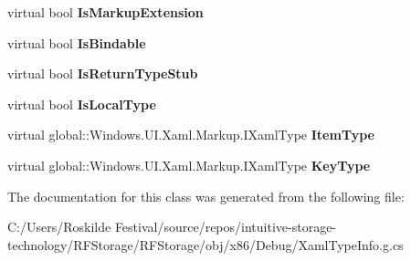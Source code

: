 \begin{DoxyCompactItemize}
\item 
\mbox{\label{class_r_f_storage_1_1_r_f_storage___xaml_type_info_1_1_xaml_system_base_type_a3cf5327d4cd9d30144ebbbbbf9f4e09e}} 
virtual bool {\bfseries Is\+Markup\+Extension}\hspace{0.3cm}{\ttfamily  [get]}
\item 
\mbox{\label{class_r_f_storage_1_1_r_f_storage___xaml_type_info_1_1_xaml_system_base_type_a78f08dadaa8da3c3173405e5d61fbec2}} 
virtual bool {\bfseries Is\+Bindable}\hspace{0.3cm}{\ttfamily  [get]}
\item 
\mbox{\label{class_r_f_storage_1_1_r_f_storage___xaml_type_info_1_1_xaml_system_base_type_a948e3237d0675e65818937eb637bd75e}} 
virtual bool {\bfseries Is\+Return\+Type\+Stub}\hspace{0.3cm}{\ttfamily  [get]}
\item 
\mbox{\label{class_r_f_storage_1_1_r_f_storage___xaml_type_info_1_1_xaml_system_base_type_aa72f0aa88b6465a3d167a1c7e2a40c29}} 
virtual bool {\bfseries Is\+Local\+Type}\hspace{0.3cm}{\ttfamily  [get]}
\item 
\mbox{\label{class_r_f_storage_1_1_r_f_storage___xaml_type_info_1_1_xaml_system_base_type_ad6844bab354c07e237da7d4ab916b67f}} 
virtual global\+::\+Windows.\+U\+I.\+Xaml.\+Markup.\+I\+Xaml\+Type {\bfseries Item\+Type}\hspace{0.3cm}{\ttfamily  [get]}
\item 
\mbox{\label{class_r_f_storage_1_1_r_f_storage___xaml_type_info_1_1_xaml_system_base_type_a74a99fce9aca2238dc03e92fda2be5b6}} 
virtual global\+::\+Windows.\+U\+I.\+Xaml.\+Markup.\+I\+Xaml\+Type {\bfseries Key\+Type}\hspace{0.3cm}{\ttfamily  [get]}
\end{DoxyCompactItemize}


The documentation for this class was generated from the following file\+:\begin{DoxyCompactItemize}
\item 
C\+:/\+Users/\+Roskilde Festival/source/repos/intuitive-\/storage-\/technology/\+R\+F\+Storage/\+R\+F\+Storage/obj/x86/\+Debug/Xaml\+Type\+Info.\+g.\+cs\end{DoxyCompactItemize}
